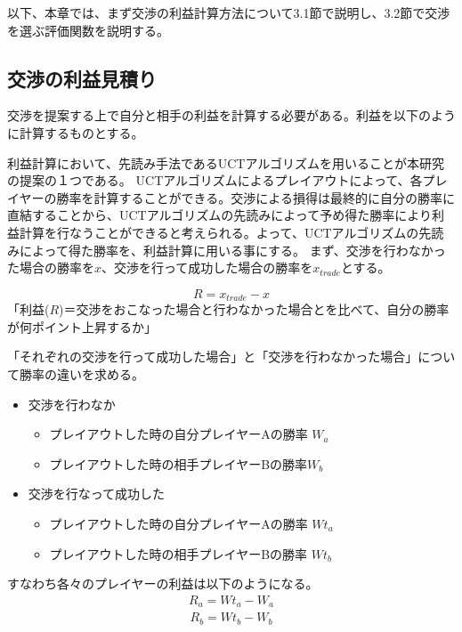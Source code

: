 \documentclass[a4, 10pt,dvipdfmx]{jsarticle}
\begin{document}
以下、本章では、まず交渉の利益計算方法について3.1節で説明し、3.2節で交渉を選ぶ評価関数を説明する。

\subsection{交渉の利益見積り}

交渉を提案する上で自分と相手の利益を計算する必要がある。利益を以下のように計算するものとする。

利益計算において、先読み手法であるUCTアルゴリズムを用いることが本研究の提案の１つである。
UCTアルゴリズムによるプレイアウトによって、各プレイヤーの勝率を計算することができる。交渉による損得は最終的に自分の勝率に直結することから、UCTアルゴリズムの先読みによって予め得た勝率により利益計算を行なうことができると考えられる。よって、UCTアルゴリズムの先読みによって得た勝率を、利益計算に用いる事にする。  
まず、交渉を行わなかった場合の勝率を$x$、交渉を行って成功した場合の勝率を$x_{trade}$とする。

\begin{equation}
  R = x_{trade} - x
\end{equation}
「利益($R$)＝交渉をおこなった場合と行わなかった場合とを比べて、自分の勝率が何ポイント上昇するか」

「それぞれの交渉を行って成功した場合」と「交渉を行わなかった場合」について勝率の違いを求める。
\begin{itemize}
 \item 交渉を行わなか
    \begin{itemize}
      \item プレイアウトした時の自分プレイヤーAの勝率 $W_a$
      \item プレイアウトした時の相手プレイヤーBの勝率$W_b$
     \end{itemize}
 \item 交渉を行なって成功した
    \begin{itemize}
      \item プレイアウトした時の自分プレイヤーAの勝率 $Wt_a$
      \item プレイアウトした時の相手プレイヤーBの勝率 $Wt_b$
     \end{itemize}
\end{itemize}
すなわち各々のプレイヤーの利益は以下のようになる。
\begin{eqnarray}
  R_{a}=Wt_a - W_a
\end{eqnarray}
\begin{eqnarray}
  R_{b}=Wt_b - W_b
\end{eqnarray}
\end{document}
